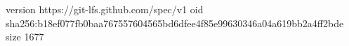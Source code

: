 version https://git-lfs.github.com/spec/v1
oid sha256:b18ef077fb0baa767557604565bd6dfee4f85e99630346a04a619bb2a4ff2bde
size 1677
